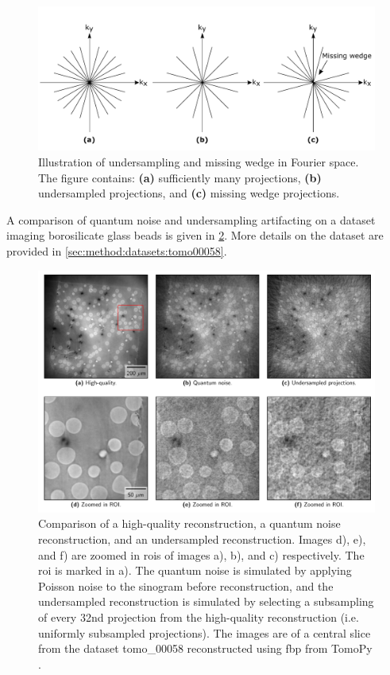 \begin{figure}[htbp]  
    \centering
    \includegraphics[width=.8\textwidth]{figures/undersampling.pdf}
    \caption[Illustration of undersampling and missing wedge in Fourier space]{Illustration of undersampling and missing wedge in Fourier space. The figure contains: \textbf{(a)} sufficiently many projections, \textbf{(b)} undersampled projections, and \textbf{(c)} missing wedge projections. }
    \label{fig:undersampling}
\end{figure}

A comparison of quantum noise and undersampling artifacting on a dataset imaging borosilicate glass beads is given in \cref{fig:noisecomparison}. More details on the dataset are provided in \cref{sec:method:datasets:tomo00058}. 

\begin{figure}[htbp]  
    \centering
    \includegraphics[width=.9\textwidth]{figures/noisecomparison.pdf}
    \caption[Illustration of reconstruction noise and artifacting]{Comparison of a high-quality reconstruction, a quantum noise reconstruction, and an undersampled reconstruction. Images d), e), and f) are zoomed in \gls{roi}s of images a), b), and c) respectively. The \gls{roi} is marked in a). The quantum noise is simulated by applying Poisson noise to the sinogram before reconstruction, and the undersampled reconstruction is simulated by selecting a subsampling of every 32nd projection from the high-quality reconstruction (i.e. uniformly subsampled projections). The images are of a central slice from the dataset tomo\_00058 \cite{datasetglassspheres} reconstructed using \gls{fbp} from TomoPy \cite{TomoBank}. }
    \label{fig:noisecomparison}
\end{figure}

